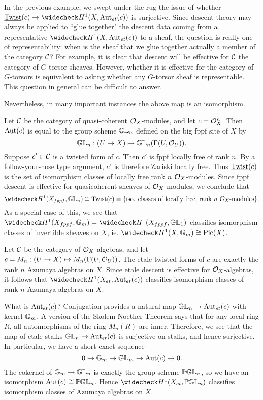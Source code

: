 In the previous example, we swept under the rug the issue of whether $\twist(c)\rightarrow\wc{H}^1(X,\Aut_{et}(c))$ is surjective.  Since descent theory may always be applied to ``glue together" the descent data coming from a representative $\wc{H}^1(X,\Aut_{et}(c))$ to a sheaf, the question is really one of representability: when is the sheaf that we glue together actually a member of the category $\mathcal{C}$?  For example, it is clear that descent will be effective for $\mathcal{C}$ the category of $G$-torsor sheaves.  However, whether it is effective for the category of $G$-torsors is equivalent to asking whether any $G$-torsor sheaf is representable.  This question in general can be difficult to answer.

Nevertheless, in many important instances the above map is an isomorphism.
\begin{ex}
Let $\mathcal{C}$ be the category of quasi-coherent $\mathcal{O}_X$-modules, and let $c = \mathcal{O}_X^n$.  Then $\textnormal{Aut}(c)$ is equal to the group scheme $\mathbb{GL}_n$ defined on the big fppf site of $X$ by
$$\mathbb{GL}_n: (U\rightarrow X)\mapsto \mathbb{GL}_n(\Gamma(U,\mathcal{O}_U)).$$
Suppose $c'\in\mathcal{C}$ is a twisted form of $c$.  Then $c'$ is fppf locally free of rank $n$.  By a follow-your-nose type argument, $c'$ is therefore Zariski locally free.  Thus $\textnormal{\underline{Twist}}(c)$ is the set of isomorphism classes of locally free rank $n$ $\mathcal{O}_X$-modules.  Since fppf descent is  effective for quasicoherent sheaves of $\mathcal{O}_X$-modules, we conclude that
$$\wc{H}^1(X_{fppf},\bbgl_n)\cong \twist(c) = \{\text{iso. classes of locally free, rank $n$ $\sheaf O_X$-modules}\}.$$
As a special case of this, we see that $\wc{H}^1(X_{fppf},\bbg_m) = \wc H^1(X_{fppf},\bbgl_1)$ classifies isomorphism classes of invertible sheaves on $X$, ie. $\wc{H}^1(X,\bbg_m) \cong \Pic(X)$.
\end{ex}
\begin{ex}
Let $\mathcal{C}$ be the category of $\mathcal{O}_X$-algebras, and let $c = M_n: (U\rightarrow X)\mapsto M_n(\Gamma(U,\mathcal{O}_U))$.  The etale twisted forms of $c$ are exactly the rank $n$ Azumaya algebras on $X$.  Since etale descent is effective for $\mathcal{O}_X$-algebras, it follows that $\wc{H}^1(X_{et},\Aut_{et}(c))$ classifies isomorphism classes of rank $n$ Azumaya algebras on $X$.

What is $\textnormal{Aut}_{et}(c)$?  Conjugation provides a natural map $\mathbb{GL}_n\rightarrow \textnormal{Aut}_{et}(c)$ with kernel $\mathbb{G}_m$.  A version of the Skolem-Noether Theorem says that for any local ring $R$, all automorphisms of the ring $M_n(R)$ are inner.  Therefore, we see that the map of etale stalks $\mathbb{GL}_n\rightarrow\textnormal{Aut}_{et}(c)$ is surjective on stalks, and hence surjective.  In particular, we have a short exact sequence
$$0\rightarrow\mathbb{G}_m\rightarrow\mathbb{GL}_m\rightarrow\textnormal{Aut}(c)\rightarrow 0.$$
The cokernel of $\mathbb{G}_m\rightarrow \mathbb{GL}_n$ is exactly the group scheme $\mathbb{PGL}_n$, so we have an isomorphism $\textnormal{Aut}(c)\cong\mathbb{PGL}_n$.  Hence $\wc H^1(X_{et},\bbpgl_n)$ classifies isomorphism classes of Azumaya algebras on $X$.
\end{ex}

